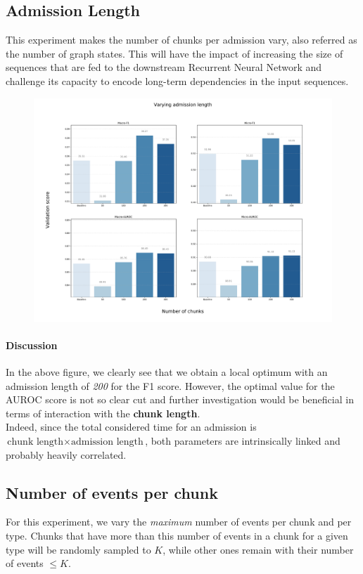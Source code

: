 \newpage
\subsection{Admission Length}
This experiment makes the number of chunks per admission vary, also referred as the number of graph states. This will have the impact of increasing the size of sequences that are fed to the downstream Recurrent Neural Network and challenge its capacity to encode long-term dependencies in the input sequences.

\begin{figure}[H]
 \centering
 \includegraphics[width=\textwidth]{figures/exp-chunks.pdf}
\end{figure}

\paragraph{Discussion} In the above figure, we clearly see that we obtain a local optimum with an admission length of \emph{200} for the F1 score. However, the optimal value for the AUROC score is not so clear cut and further investigation would be beneficial in terms of interaction with the \textbf{chunk length}. \\

Indeed, since the total considered time for an admission is $\mbox{chunk length} \times \mbox{admission length}$, both parameters are intrinsically linked and probably heavily correlated.

\newpage
\subsection{Number of events per chunk}
For this experiment, we vary the \textit{maximum} number of events per chunk and per type. Chunks that have more than this number of events in a chunk for a given type will be randomly sampled to $K$, while other ones remain with their number of events $\leq K$.

